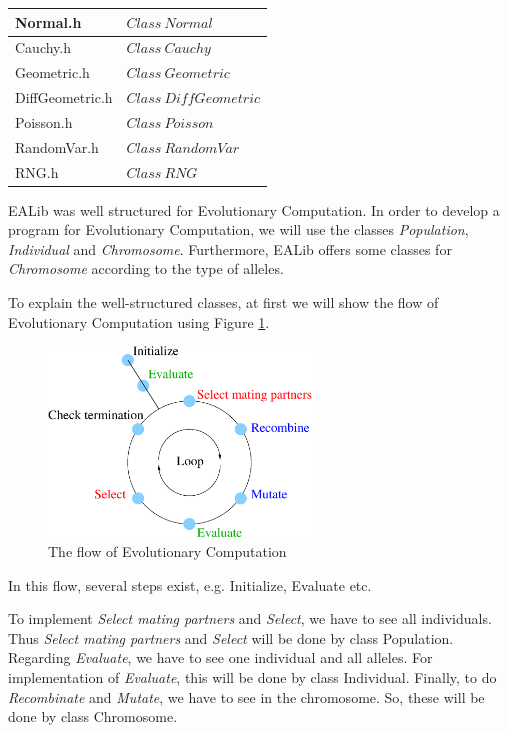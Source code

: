 \documentclass[twocolumn]{article}
\begin{document}
\begin{table}[h]
\begin{center}
{\begin{tabular}{|l|l|}
Normal.h          & $Class \ Normal             $ \\\hline
Cauchy.h          & $Class \ Cauchy             $ \\\hline
Geometric.h       & $Class \ Geometric          $ \\\hline
DiffGeometric.h   & $Class \ DiffGeometric      $ \\\hline      
Poisson.h         & $Class \ Poisson            $ \\\hline
RandomVar.h       & $Class \ RandomVar          $ \\\hline
RNG.h             & $Class \ RNG                $ \\\hline
\end{tabular}
}
\end{center}
\end{table}

\noindent
EALib was well structured for Evolutionary Computation. In order to
develop a program for Evolutionary Computation, we will use the classes {\em
Population}, {\em Individual} and {\em Chromosome}. Furthermore, EALib 
offers some classes for {\em Chromosome} according to the type of 
alleles. 

\noindent
To explain the well-structured classes, at first we will show the flow of
Evolutionary Computation using Figure \ref{EC}.

\begin{figure}[h]
\begin{center}
\includegraphics[width=7cm]{EvolutionaryComputation.eps}
\caption{The flow of Evolutionary Computation}
\label{EC}
\end{center}
\end{figure}

\noindent
In this flow, several steps exist, e.g. Initialize, Evaluate etc.

\noindent
To implement {\em Select mating partners} and {\em Select}, we have to see all
individuals. Thus {\em Select mating partners} and {\em Select} will
be done by class
Population. Regarding {\em Evaluate}, we have to see one individual
and all alleles. For implementation of {\em Evaluate}, this will be
done by class Individual. Finally, to do {\em Recombinate} and {\em
Mutate}, we have to see in the chromosome. So, these will be done by class Chromosome.
\end{document}
